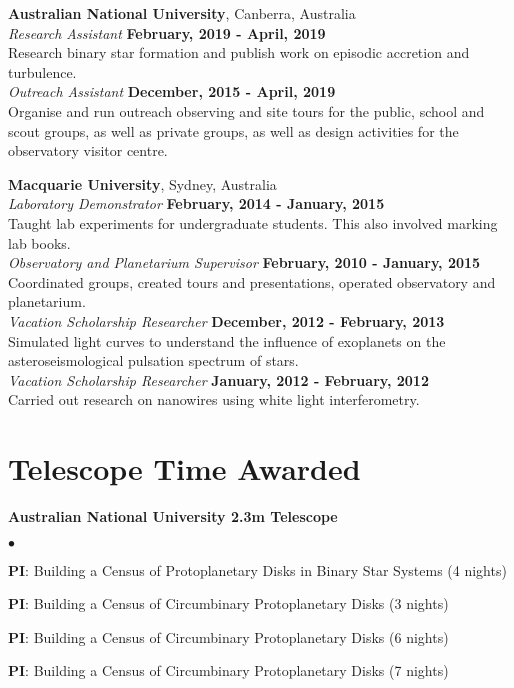 \documentclass[margin,line]{res}
\newenvironment{list1}{
	\begin{list}{\ding{113}}{%
			\setlength{\itemsep}{0in}
			\setlength{\parsep}{0in} \setlength{\parskip}{0in}
			\setlength{\topsep}{0in} \setlength{\partopsep}{0in} 
			\setlength{\leftmargin}{0.17in}}}{\end{list}}
\newenvironment{list2}{
	\begin{list}{$\bullet$}{%
			\setlength{\itemsep}{0in}
			\setlength{\parsep}{0in} \setlength{\parskip}{0in}
			\setlength{\topsep}{0in} \setlength{\partopsep}{0in} 
			\setlength{\leftmargin}{0.2in}}}{\end{list}}
\begin{document}
\begin{resume}
		{\bf Australian National University}, Canberra, Australia\\
		{\em Research Assistant} \hfill {\bf February, 2019 - April, 2019}\\
		Research binary star formation and publish work on episodic accretion and turbulence.\\
		{\em Outreach Assistant} \hfill {\bf December, 2015 - April, 2019}\\
		Organise and run outreach observing and site tours for the public, school and scout groups, as well as private groups, as well as design activities for the observatory visitor centre.
		
		{\bf Macquarie University}, Sydney, Australia\\
		{\em Laboratory Demonstrator} \hfill {\bf February, 2014 - January, 2015}\\
		Taught lab experiments for undergraduate students. This also involved marking lab books.\\
		{\em Observatory and Planetarium Supervisor} \hfill {\bf February, 2010 - January, 2015}\\
		Coordinated groups, created tours and presentations, operated observatory and planetarium.\\
		{\em Vacation Scholarship Researcher} \hfill {\bf December, 2012 - February, 2013}\\
		Simulated light curves to understand the influence of exoplanets on the asteroseismological pulsation spectrum of stars.\\
		{\em Vacation Scholarship Researcher} \hfill {\bf January, 2012 - February, 2012}\\
		Carried out research on nanowires using white light interferometry.\\
		
		\section{\sc Telescope Time Awarded}
		\begin{list1}
			\item[] {\bf Australian National University 2.3m Telescope}
			\begin{list2}
				\item {\bf PI}: Building a Census of Protoplanetary Disks in Binary Star Systems (4 nights)
				\item {\bf PI}: Building a Census of Circumbinary Protoplanetary Disks (3 nights)
				\item {\bf PI}: Building a Census of Circumbinary Protoplanetary Disks (6 nights)
				\item {\bf PI}: Building a Census of Circumbinary Protoplanetary Disks (7 nights)
			\end{list2}
		\end{list1}
		

\end{resume}
\end{document}
